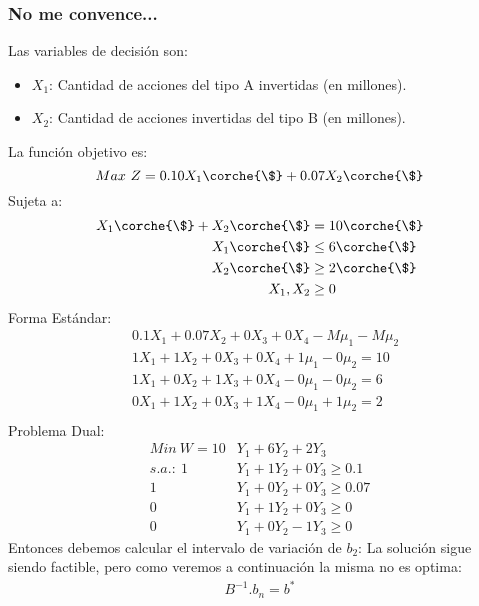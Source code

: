 \begin{homeworkProblem}
\subsubsection{No me convence...}
Las variables de decisión son:
\begin{itemize}
	\item $X_1$: Cantidad de acciones del tipo A invertidas (en millones).
	\item $X_2$: Cantidad de acciones invertidas del tipo B (en millones).
\end{itemize}
La función objetivo es: 
\begin{equation}
	Max\ Z = 0.10X_1\corche{\$} + 0.07X_2\corche{\$}
\end{equation}
Sujeta a:
\begin{align*}
	X_1\corche{\$}+X_2\corche{\$} &= 10\corche{\$} \\
	X_1\corche{\$} &\le 6\corche{\$} \\
	X_2\corche{\$} &\ge 2\corche{\$} \\
	X_1,X_2 &\ge 0
\end{align*}
Forma Estándar:
\begin{align*}
&0.1X_1 + 0.07X_2 + 0X_3 + 0X_4 - M\mu_1 - M\mu_2 \\
&1X_1 +1X_2 + 0X_3 + 0X_4 + 1\mu_1 - 0\mu_2 = 10 \\
&1X_1 + 0X_2 + 1X_3 + 0X_4 - 0\mu_1 - 0\mu_2 = 6\\
&0X_1 + 1X_2 + 0X_3 + 1X_4 - 0\mu_1 + 1\mu_2 = 2\\
\end{align*}
Problema Dual:
\begin{align*}
    Min\ W = 10&Y_1 + 6Y_2 + 2Y_3 \\
    s.a.:\ 1&Y_1 + 1Y_2 + 0Y_3 \ge 0.1 \\
    1&Y_1 + 0Y_2  + 0Y_3 \ge 0.07 \\
    0&Y_1 + 1Y_2 + 0Y_3 \ge 0 \\
    0&Y_1 + 0Y_2 - 1 Y_3 \ge 0
\end{align*}
Entonces debemos calcular el intervalo de variación de $b_2$:
La solución sigue siendo factible, pero como veremos a continuación la misma no es optima:
\begin{align*}
    B^{-1}.b_n = b^{*} \\

\end{align*}
\end{homeworkProblem}
